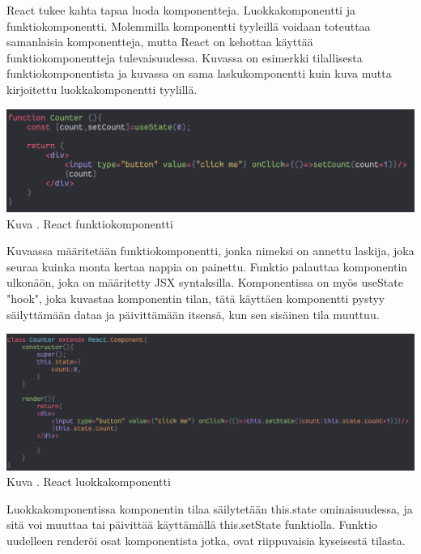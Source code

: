 React tukee kahta tapaa luoda komponentteja. Luokkakomponentti ja funktiokomponentti.
Molemmilla komponentti tyyleillä voidaan toteuttaa samanlaisia komponentteja, mutta React on kehottaa käyttää funktiokomponentteja tulevaisuudessa. 
Kuvassa \nextImageCount {} on esimerkki tilallisesta funktiokomponentista ja
kuvassa \nextnextImageCount {} on sama laskukomponentti kuin kuva \nextImageCount{} mutta kirjoitettu luokkakomponentti tyylillä. 
\medskip


\bigskip
\includegraphics[width=15cm]{src/public/oppar/function_component.png}\\
Kuva \getImgCount{}. React funktiokomponentti
\medskip

Kuvaassa \theimgCounter{} määritetään funktiokomponentti, jonka nimeksi on annettu laskija, joka seuraa kuinka monta kertaa nappia on painettu.
Funktio palauttaa komponentin ulkonäön, joka on määritetty JSX syntaksilla.
Komponentissa on myös useState "hook"{}, joka kuvastaa komponentin tilan,
tätä käyttäen komponentti pystyy säilyttämään dataa ja päivittämään itsensä, kun sen sisäinen tila muuttuu.
\medskip




\bigskip
\includegraphics[width=15cm]{src/public/oppar/class_.png}\\
Kuva \getImgCount{}. React luokkakomponentti
\medskip



Luokkakomponentissa komponentin tilaa säilytetään this.state ominaisuudessa, ja sitä voi muuttaa tai päivittää käyttämällä this.setState funktiolla. 
Funktio uudelleen renderöi osat komponentista jotka, ovat riippuvaisia kyseisestä tilasta.
\medskip


